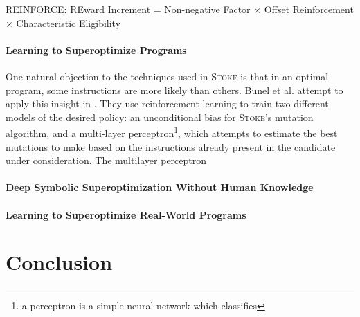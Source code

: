 \documentclass[12pt,twoside]{reedthesis}
\begin{document}



REINFORCE: REward Increment = Non-negative Factor $\times$ Offset Reinforcement $\times$ Characteristic Eligibility

\subsubsection{Learning to Superoptimize Programs}
One natural objection to the techniques used in \textsc{Stoke} is that in an optimal program, some instructions are more likely than others.
Bunel et al. attempt to apply this insight in \cite{bunel2017learning}.
They use reinforcement learning to train two different models of the desired policy:
    an unconditional bias for \textsc{Stoke}'s mutation algorithm,
    and a multi-layer perceptron\footnote{a perceptron is a simple neural network which classifies },
        which attempts to estimate the best mutations to make based on the instructions already present in the candidate under consideration.
The multilayer perceptron

\subsubsection{Deep Symbolic Superoptimization Without Human Knowledge}
\cite{hui2020deep}

\subsubsection{Learning to Superoptimize Real-World Programs}
\cite{shypula2022learning}

\chapter{Conclusion}
\end{document}
